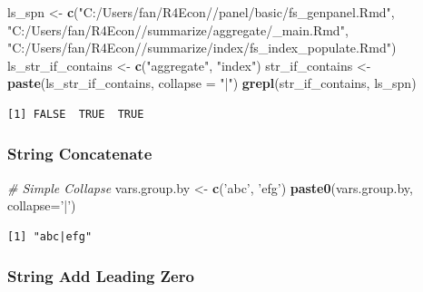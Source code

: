 \documentclass[
]{book}
\newenvironment{Shaded}{\begin{snugshade}}{\end{snugshade}}
\newcommand{\CommentTok}[1]{\textcolor[rgb]{0.56,0.35,0.01}{\textit{#1}}}
\newcommand{\DataTypeTok}[1]{\textcolor[rgb]{0.13,0.29,0.53}{#1}}
\newcommand{\DecValTok}[1]{\textcolor[rgb]{0.00,0.00,0.81}{#1}}
\newcommand{\KeywordTok}[1]{\textcolor[rgb]{0.13,0.29,0.53}{\textbf{#1}}}
\newcommand{\NormalTok}[1]{#1}
\newcommand{\StringTok}[1]{\textcolor[rgb]{0.31,0.60,0.02}{#1}}
\begin{document}
\begin{Shaded}
\begin{Highlighting}[]
\NormalTok{ls_spn <-}\StringTok{ }\KeywordTok{c}\NormalTok{(}\StringTok{"C:/Users/fan/R4Econ//panel/basic/fs_genpanel.Rmd"}\NormalTok{,}
            \StringTok{"C:/Users/fan/R4Econ//summarize/aggregate/_main.Rmd"}\NormalTok{,}
            \StringTok{"C:/Users/fan/R4Econ//summarize/index/fs_index_populate.Rmd"}\NormalTok{)}
\NormalTok{ls_str_if_contains <-}\StringTok{ }\KeywordTok{c}\NormalTok{(}\StringTok{"aggregate"}\NormalTok{, }\StringTok{"index"}\NormalTok{)}
\NormalTok{str_if_contains <-}\StringTok{ }\KeywordTok{paste}\NormalTok{(ls_str_if_contains, }\DataTypeTok{collapse =} \StringTok{"|"}\NormalTok{)}
\KeywordTok{grepl}\NormalTok{(str_if_contains, ls_spn)}
\end{Highlighting}
\end{Shaded}

\begin{verbatim}
[1] FALSE  TRUE  TRUE
\end{verbatim}

\hypertarget{string-concatenate}{%
\subsubsection{String Concatenate}\label{string-concatenate}}

\begin{Shaded}
\begin{Highlighting}[]
\CommentTok{# Simple Collapse}
\NormalTok{vars.group.by <-}\StringTok{ }\KeywordTok{c}\NormalTok{(}\StringTok{'abc'}\NormalTok{, }\StringTok{'efg'}\NormalTok{)}
\KeywordTok{paste0}\NormalTok{(vars.group.by, }\DataTypeTok{collapse=}\StringTok{'|'}\NormalTok{)}
\end{Highlighting}
\end{Shaded}

\begin{verbatim}
[1] "abc|efg"
\end{verbatim}

\hypertarget{string-add-leading-zero}{%
\subsubsection{String Add Leading Zero}\label{string-add-leading-zero}}

\begin{Shaded}
\end{Shaded}
\end{document}
